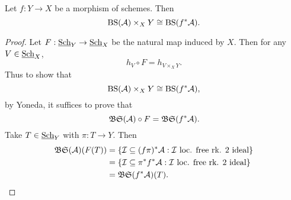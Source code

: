 \begin{lem}
Let $f: Y\rightarrow X$ be a morphism of schemes.  Then
$$\textnormal{BS}(\mathcal{A})\times_X Y\cong \textnormal{BS}(f^*\mathcal{A}).$$
\end{lem}
\begin{proof}
Let $F: \textnormal{\underline{Sch}}_Y\rightarrow\textnormal{\underline{Sch}}_X$ be the natural map induced by $X$.  Then for any $V\in\textnormal{\underline{Sch}}_X$,
$$h_V\circ F = h_{V\times_XY}.$$
Thus to show that
$$\textnormal{BS}(\mathcal{A})\times_X Y\cong \textnormal{BS}(f^*\mathcal{A}),$$
by Yoneda, it suffices to prove that
$$\mathfrak{BS}(\mathcal{A})\circ F = \mathfrak{BS}(f^*\mathcal{A}).$$
Take $T\in\textnormal{\underline{Sch}}_Y$ with $\pi: T\rightarrow Y$.  Then
\begin{align*}
\mathfrak{BS}(\mathcal{A})(F(T)) & = \{\mathcal{I}\subseteq (f\pi)^*\mathcal{A}: \mathcal{I}\ \text{loc. free rk. $2$ ideal}\}\\
                     & = \{\mathcal{I}\subseteq \pi^*f^*\mathcal{A}: \mathcal{I}\ \text{loc. free rk. $2$ ideal}\}\\
                     & = \mathfrak{BS}(f^*\mathcal{A})(T).
\end{align*}
\end{proof}


